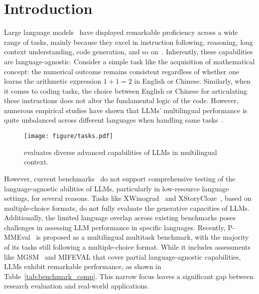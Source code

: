 \section{Introduction}

Large language models~\cite{openai2024gpt4,team2024gemini,DeepSeekAI2024DeepSeekV3TR} have displayed remarkable proficiency across a wide range of tasks, mainly because they excel in instruction following, reasoning, long context understanding, code generation, and so on~\cite{ouyang2022training,cobbe2021training,su2024roformer,roziere2023code,lu2024llamax,sun2024survey}. Inherently, these capabilities are language-agnostic. 
Consider a simple task like the acquisition of mathematical concept: the numerical outcome remains consistent regardless of whether one learns the arithmetic expression $1+1=2$ in English or Chinese.  
Similarly, when it comes to coding tasks, the choice between English or Chinese for articulating these instructions does not alter the fundamental logic of the code. 
However, numerous empirical studies have shown that LLMs' multilingual performance is quite unbalanced across different languages when handling same tasks~\cite{shi2023language, zhu2024multilingual, qi2023cross}.

\begin{figure}[t]
    \centering
    \texttt{[image: figure/tasks.pdf]}
    \caption{\name evaluates diverse advanced capabilities of LLMs in multilingual context.}
    \label{fig:capability}
    \vskip -0.2in
\end{figure}

However, current benchmarks~\cite{hendrycks2021measuring,lai2023okapi,singh2024global,wang2024seaeval} do not support comprehensive testing of the language-agnostic abilities of LLMs, particularly in low-resource language settings, for several reasons. Tasks like XWinograd~\cite{xwinograd-muennighoff-etal-2023-crosslingual} and XStoryCloze~\cite{xstorycloze-lin-etal-2022-shot}, based on multiple-choice formats, do not fully evaluate the generative capacities of LLMs. 
Additionally, the limited language overlap across existing benchmarks poses challenges in assessing LLM performance in specific languages. 
Recently, P-MMEval~\cite{zhang2024pmmeval} is proposed as a multilingual multitask benchmark, with the majority of its tasks still following a multiple-choice format. 
While it includes assessments like MGSM~\cite{shi2023language} and MIFEVAL that cover partial language-agnostic capabilities, LLMs exhibit remarkable performance, as shown in Table~\ref{tab:benchmark_comp}. 
This narrow focus leaves a significant gap between research evaluation and real-world applications.

